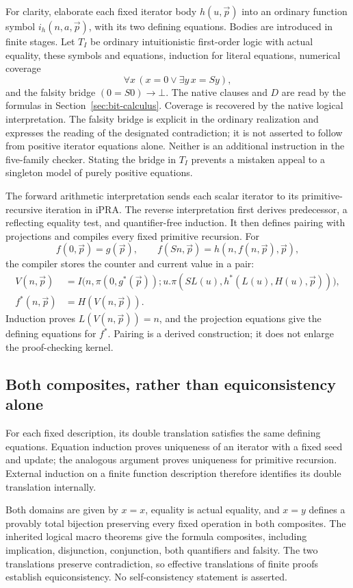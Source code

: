 \documentclass[11pt,letterpaper]{article}
\theoremstyle{definition}
\theoremstyle{remark}
\newcommand{\IPRA}{\mathrm{iPRA}}
\begin{document}
For clarity, elaborate each fixed iterator body $h(u,\vec p)$ into an
ordinary function symbol $i_h(n,a,\vec p)$, with its two defining
equations. Bodies are introduced in finite stages. Let $T_I$ be ordinary
intuitionistic first-order logic with actual equality, these symbols and
equations, induction for literal equations, numerical coverage
\[
 \forall x\,(x=0\lor\exists y\,x=Sy),
\]
and the falsity bridge $(0=S0)\to\bot$.
The native clauses and $D$ are read by the formulas in
Section~\ref{sec:bit-calculus}. Coverage is recovered by the native
logical interpretation. The falsity bridge is explicit in the ordinary
realization and expresses the reading of the designated contradiction;
it is not asserted to follow from positive iterator equations alone.
Neither is an additional instruction in the five-family checker.
Stating the bridge in $T_I$
prevents a mistaken appeal to a singleton model of purely positive
equations.

The forward arithmetic interpretation sends each scalar iterator to its
primitive-recursive iteration in $\IPRA$. The reverse interpretation
first derives predecessor, a reflecting equality test, and quantifier-free
induction. It then defines pairing with projections and compiles every
fixed primitive recursion. For
\[
 f(0,\vec p)=g(\vec p),\qquad
 f(Sn,\vec p)=h(n,f(n,\vec p),\vec p),
\]
the compiler stores the counter and current value in a pair:
\begin{align*}
 V(n,\vec p)&=I\bigl(n,\pi(0,g^*(\vec p));
 u.\pi(SL(u),h^*(L(u),H(u),\vec p))\bigr),\\
 f^*(n,\vec p)&=H(V(n,\vec p)).
\end{align*}
Induction proves $L(V(n,\vec p))=n$, and the projection equations give
the defining equations for $f^*$. Pairing is a derived construction; it
does not enlarge the proof-checking kernel.

\subsection{Both composites, rather than equiconsistency alone}

For each fixed description, its double translation satisfies the same
defining equations. Equation induction proves uniqueness of an iterator
with a fixed seed and update; the analogous argument proves uniqueness
for primitive recursion. External induction on a finite function
description therefore identifies its double translation internally.

Both domains are given by $x=x$, equality is actual equality, and
$x=y$ defines a provably total bijection preserving every fixed
operation in both composites. The inherited logical macro theorems give
the formula composites, including implication, disjunction, conjunction,
both quantifiers and falsity. The two translations preserve contradiction,
so effective translations of finite proofs establish equiconsistency.
No self-consistency statement is asserted.
\end{document}
